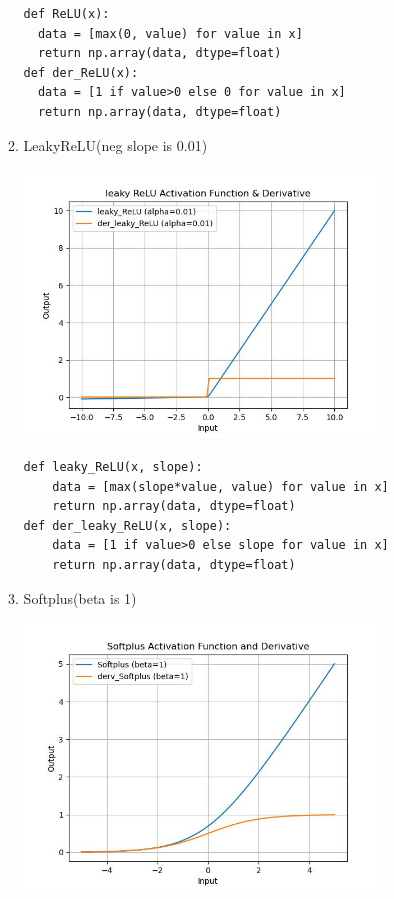 \documentclass{article}
\begin{document}
\begin{enumerate}
\begin{enumerate}
\begin{tcolorbox}
                \end{tcolorbox}
                \begin{verbatim}
def ReLU(x):
  data = [max(0, value) for value in x]
  return np.array(data, dtype=float)
def der_ReLU(x):
  data = [1 if value>0 else 0 for value in x]
  return np.array(data, dtype=float)
                \end{verbatim}
          \item LeakyReLU(neg slope is 0.01)
                \begin{tcolorbox}
                  \includegraphics[width=9.5cm]{leaky_relu.jpg}
                \end{tcolorbox}
                \begin{verbatim}
def leaky_ReLU(x, slope):
    data = [max(slope*value, value) for value in x]
    return np.array(data, dtype=float)  
def der_leaky_ReLU(x, slope):
    data = [1 if value>0 else slope for value in x]
    return np.array(data, dtype=float)                
                \end{verbatim}
          \item Softplus(beta is 1)
                \begin{tcolorbox}
                  \includegraphics[width=9.5cm]{softplus.jpg}

\end{tcolorbox}
\end{enumerate}
\end{enumerate}
\end{document}
